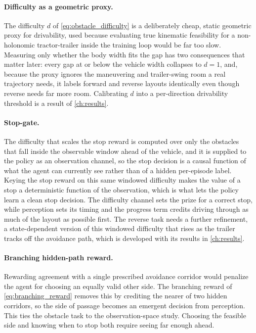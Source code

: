 \paragraph{Difficulty as a geometric proxy.}
The difficulty $d$ of \cref{eq:obstacle_difficulty} is a deliberately cheap, static geometric proxy for drivability, used because evaluating true kinematic feasibility for a non-holonomic tractor-trailer inside the training loop would be far too slow. Measuring only whether the body width fits the gap has two consequences that matter later: every gap at or below the vehicle width collapses to $d=1$, and, because the proxy ignores the maneuvering and trailer-swing room a real trajectory needs, it labels forward and reverse layouts identically even though reverse needs far more room. Calibrating $d$ into a per-direction drivability threshold is a result of \cref{ch:results}.

\paragraph{Stop-gate.}
The difficulty that scales the stop reward is computed over only the obstacles that fall inside the observable window ahead of the vehicle, and it is supplied to the policy as an observation channel, so the stop decision is a causal function of what the agent can currently see rather than of a hidden per-episode label. Keying the stop reward on this same windowed difficulty makes the value of a stop a deterministic function of the observation, which is what lets the policy learn a clean stop decision. The difficulty channel sets the prize for a correct stop, while perception sets its timing and the progress term credits driving through as much of the layout as possible first. The reverse task needs a further refinement, a state-dependent version of this windowed difficulty that rises as the trailer tracks off the avoidance path, which is developed with its results in \cref{ch:results}.

\paragraph{Branching hidden-path reward.}
Rewarding agreement with a single prescribed avoidance corridor would penalize the agent for choosing an equally valid other side. The branching reward of \cref{eq:branching_reward} removes this by crediting the nearer of two hidden corridors, so the side of passage becomes an emergent decision from perception. This ties the obstacle task to the observation-space study. Choosing the feasible side and knowing when to stop both require seeing far enough ahead.

